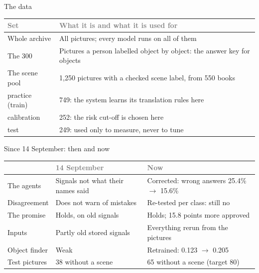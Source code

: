 \documentclass[aspectratio=169,11pt]{beamer}
\newcommand{\h}[1]{\textcolor{grey}{#1}}
\newcommand{\remark}[1]{\par\vspace{0.35cm}{\small\textcolor{grey}{#1}}}
\begin{document}
\begin{frame}{The data}
\begin{tabular}{@{}L{4.2cm} L{8.6cm}@{}}
\toprule
\h{Set} & \h{What it is and what it is used for}\\
\midrule
Whole archive & All pictures; every model runs on all of them\\
The 300 & Pictures a person labelled object by object: the answer key for objects\\
The scene pool & 1,250 pictures with a checked scene label, from 550 books\\
\quad practice (train) & 749: the system learns its translation rules here\\
\quad calibration & 252: the risk cut-off is chosen here\\
\quad test & 249: used only to measure, never to tune\\
\bottomrule
\end{tabular}
\end{frame}

\begin{frame}{Since 14 September: then and now}
\begin{tabular}{@{}L{2.8cm} L{4.6cm} L{5.4cm}@{}}
\toprule
 & \h{14 September} & \h{Now}\\
\midrule
The agents     & Signals not what their names said & Corrected: wrong answers 25.4\% $\to$ 15.6\%\\
Disagreement   & Does not warn of mistakes         & Re-tested per class: still no\\
The promise    & Holds, on old signals             & Holds; 15.8 points more approved\\
Inputs         & Partly old stored signals         & Everything rerun from the pictures\\
Object finder  & Weak                              & Retrained: 0.123 $\to$ 0.205\\
Test pictures  & 38 without a scene                & 65 without a scene (target 80)\\
\bottomrule
\end{tabular}
\remark{On 14 September the thesis was mainly a careful negative result. It now also has a proven positive result.}
\end{frame}
\end{document}
